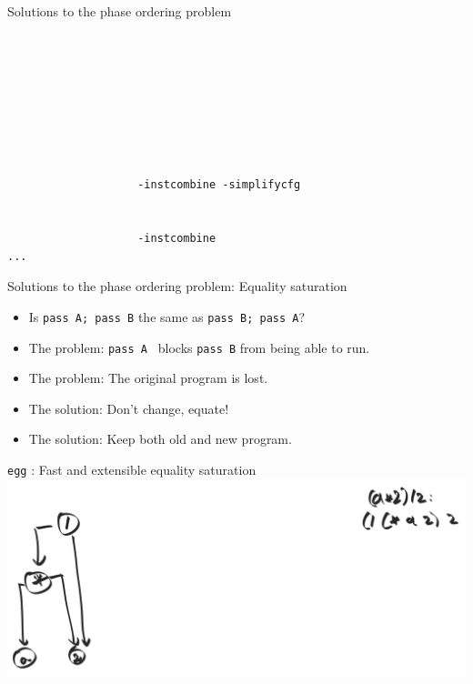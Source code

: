 \documentclass[8pt]{beamer}
\newcommand{\egg}{\texttt{egg} }
\begin{document}
\begin{frame}[fragile]{Solutions to the phase ordering problem}
\begin{verbatim}
                                                                    
                                                                       
                                                                     
                                                                        
                                                                              
                                                                       
                                                                       
                                                                
                    -instcombine -simplifycfg                                   
                                                               
                                                                        
                    -instcombine                                           
...
\end{verbatim}
\end{frame}


\begin{frame}[fragile]{Solutions to the phase ordering problem: Equality saturation}
\begin{itemize}
\item Is \texttt{pass A; pass B} the same as \texttt{pass B; pass A}?
\item The problem: \texttt{pass A } blocks \texttt{pass B} from being able to run. \pause
\item The problem: The original program is lost. \pause
\item The solution: Don't change, equate! \pause
\item The solution: Keep both old and new program. \pause
\end{itemize}
\end{frame}


\begin{frame}[fragile]{\egg: Fast and extensible equality saturation}
\includegraphics[width=\textwidth]{./eg-1-1.png}
\end{frame}
\end{document}
